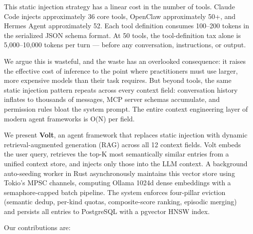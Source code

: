 \documentclass[
  10pt,
]{article}
\begin{document}
This static injection strategy has a linear cost in the number of tools.
Claude Code injects approximately 36 core tools, OpenClaw approximately
50+, and Hermes Agent approximately 52. Each tool definition consumes
100--200 tokens in the serialized JSON schema format. At 50 tools, the
tool-definition tax alone is 5,000--10,000 tokens per turn --- before
any conversation, instructions, or output.

We argue this is wasteful, and the waste has an overlooked consequence:
it raises the effective cost of inference to the point where
practitioners must use larger, more expensive models than their task
requires. But beyond tools, the same static injection pattern repeats
across every context field: conversation history inflates to thousands
of messages, MCP server schemas accumulate, and permission rules bloat
the system prompt. The entire context engineering layer of modern agent
frameworks is O(N) per field.

We present \textbf{Volt}, an agent framework that replaces static
injection with dynamic retrieval-augmented generation (RAG) across all
12 context fields. Volt embeds the user query, retrieves the top-K most
semantically similar entries from a unified context store, and injects
only those into the LLM context. A background auto-seeding worker in
Rust asynchronously maintains this vector store using Tokio's MPSC
channels, computing Ollama 1024d dense embeddings with a
semaphore-capped batch pipeline. The system enforces four-pillar
eviction (semantic dedup, per-kind quotas, composite-score ranking,
episodic merging) and persists all entries to PostgreSQL with a pgvector
HNSW index.

Our contributions are:
\end{document}
